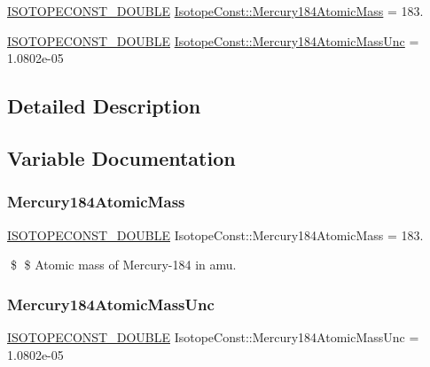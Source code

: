 \begin{DoxyCompactItemize}
\item 
\mbox{\hyperlink{group___isotope_const-_macros_ga8f45a7272ce02c0b4c65c44636ed719a}{I\+S\+O\+T\+O\+P\+E\+C\+O\+N\+S\+T\+\_\+\+D\+O\+U\+B\+LE}} \mbox{\hyperlink{group___isotope_const-_mercury-_hg184_gad5edd228002c6dc27f54f7030293ac5f}{Isotope\+Const\+::\+Mercury184\+Atomic\+Mass}} = 183.
\item 
\mbox{\hyperlink{group___isotope_const-_macros_ga8f45a7272ce02c0b4c65c44636ed719a}{I\+S\+O\+T\+O\+P\+E\+C\+O\+N\+S\+T\+\_\+\+D\+O\+U\+B\+LE}} \mbox{\hyperlink{group___isotope_const-_mercury-_hg184_ga6fd539143e1de4200c5fbc01883a643f}{Isotope\+Const\+::\+Mercury184\+Atomic\+Mass\+Unc}} = 1.\+0802e-\/05
\end{DoxyCompactItemize}


\subsection{Detailed Description}


\subsection{Variable Documentation}
\mbox{\label{group___isotope_const-_mercury-_hg184_gad5edd228002c6dc27f54f7030293ac5f}} 
\subsubsection{\texorpdfstring{Mercury184\+Atomic\+Mass}{Mercury184AtomicMass}}
{\footnotesize\ttfamily \mbox{\hyperlink{group___isotope_const-_macros_ga8f45a7272ce02c0b4c65c44636ed719a}{I\+S\+O\+T\+O\+P\+E\+C\+O\+N\+S\+T\+\_\+\+D\+O\+U\+B\+LE}} Isotope\+Const\+::\+Mercury184\+Atomic\+Mass = 183.}

\$ \$ Atomic mass of Mercury-\/184 in amu. \mbox{\label{group___isotope_const-_mercury-_hg184_ga6fd539143e1de4200c5fbc01883a643f}} 
\subsubsection{\texorpdfstring{Mercury184\+Atomic\+Mass\+Unc}{Mercury184AtomicMassUnc}}
{\footnotesize\ttfamily \mbox{\hyperlink{group___isotope_const-_macros_ga8f45a7272ce02c0b4c65c44636ed719a}{I\+S\+O\+T\+O\+P\+E\+C\+O\+N\+S\+T\+\_\+\+D\+O\+U\+B\+LE}} Isotope\+Const\+::\+Mercury184\+Atomic\+Mass\+Unc = 1.\+0802e-\/05}

